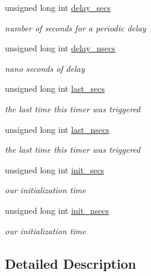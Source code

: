 \begin{DoxyCompactItemize}
unsigned long int \hyperlink{structlstimer__list__struct_a237da48d81b7e039c54901296aeee18e}{delay\_\-secs}
\begin{DoxyCompactList}\small\item\em number of seconds for a periodic delay \item\end{DoxyCompactList}\item 
unsigned long int \hyperlink{structlstimer__list__struct_acb0c6a1600c4168e5dfb2d477a685b29}{delay\_\-nsecs}
\begin{DoxyCompactList}\small\item\em nano seconds of delay \item\end{DoxyCompactList}\item 
unsigned long int \hyperlink{structlstimer__list__struct_ab0ac2907735701cb24ec9af95a1cc787}{last\_\-secs}
\begin{DoxyCompactList}\small\item\em the last time this timer was triggered \item\end{DoxyCompactList}\item 
unsigned long int \hyperlink{structlstimer__list__struct_a19acf5aa7f57aa7ce60537c3d3d6a6af}{last\_\-nsecs}
\begin{DoxyCompactList}\small\item\em the last time this timer was triggered \item\end{DoxyCompactList}\item 
unsigned long int \hyperlink{structlstimer__list__struct_a1222c76d49b149725467aa698abb7fb1}{init\_\-secs}
\begin{DoxyCompactList}\small\item\em our initialization time \item\end{DoxyCompactList}\item 
unsigned long int \hyperlink{structlstimer__list__struct_ad5bb7fa7d669b7ebbe34d8ed2bdb257a}{init\_\-nsecs}
\begin{DoxyCompactList}\small\item\em our initialization time \item\end{DoxyCompactList}\end{DoxyCompactItemize}


\subsection{Detailed Description}


